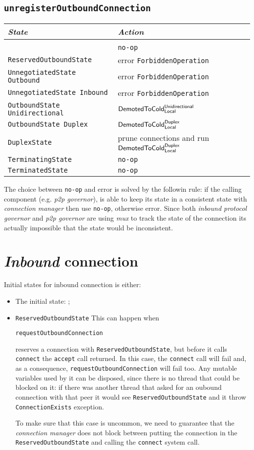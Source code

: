 \documentclass{article}
\def\InitialState{\textbullet}
\def\ReservedOutboundState{\texttt{ReservedOutboundState}}
\def\UnnegotiatedStateOut{\texttt{UnnegotiatedState Outbound}}
\def\UnnegotiatedStateIn{\texttt{UnnegotiatedState Inbound}}
\def\OutboundStateUni{\texttt{OutboundState Unidirectional}}
\def\OutboundStateDup{\texttt{OutboundState Duplex}}
\def\DuplexState{\texttt{DuplexState}}
\def\TerminatingState{\texttt{TerminatingState}}
\def\TerminatedState{\texttt{TerminatedState}}
\def\DemotedToColdDupLoc{$\text{\textsf{DemotedToCold}}^\text{\textsf{Duplex}}_\text{\textsf{Local}}$}
\def\DemotedToColdUniLoc{$\text{\textsf{DemotedToCold}}^\text{\textsf{Unidirectional}}_\text{\textsf{Local}}$}
\def\ptopgov{\textit{p2p governor}}
\def\mux{\textit{mux}}
\def\inbgov{\textit{inbound protocol governor}}
\def\connmngr{\textit{connection manager}}
\begin{document}
\subsection{\texttt{unregisterOutboundConnection}}
\begin{tabular}[h]{ll}
  \textit{State}           & \textit{Action} \\\hline\\[2pt]
  \InitialState{}          & \texttt{no-op} \\[8pt]
  \ReservedOutboundState{} & error \texttt{ForbiddenOperation} \\[8pt]
  \UnnegotiatedStateOut{}  & error \texttt{ForbiddenOperation} \\[8pt]
  \UnnegotiatedStateIn{}   & error \texttt{ForbiddenOperation} \\[8pt]
  \OutboundStateUni{}      & \DemotedToColdUniLoc{} \\[8pt]
  \OutboundStateDup{}      & \DemotedToColdDupLoc{} \\[8pt]
  \DuplexState{}           & prune connections and run \DemotedToColdDupLoc{} \\[8pt]
  \TerminatingState{}      & \texttt{no-op} \\[8pt]
  \TerminatedState{}       & \texttt{no-op} \\[8pt]
\end{tabular}
The choice between \texttt{no-op} and error is solved by the followin rule: if
the calling component (e.g. \ptopgov{}), is able to keep its state in
a consistent state with \connmngr{} then use \texttt{no-op}, otherwise
error.  Since both \inbgov{} and \ptopgov{} are using \mux{} to track the state
of the connection its actually impossible that the state would be inconsistent.

\section{\textit{Inbound} connection}
Initial states for inbound connection is either:
\begin{itemize}
  \item The initial state: \InitialState{};
  \item \ReservedOutboundState{}
    This can happen when
    \begin{center}
      \texttt{requestOutboundConnection}
    \end{center}
    reserves a connection with \ReservedOutboundState{}, but before it calls
    \texttt{connect} the \texttt{accept} call returned.  In this case, the
    \texttt{connect} call will fail and, as a consequence,
    \texttt{requestOutboundConnection} will fail too.  Any mutable variables
    used by it can be disposed, since there is no thread that could be blocked
    on it: if there was another thread that asked for an oubound connection
    with that peer it would see \ReservedOutboundState{} and it throw
    \texttt{ConnectionExists} exception.

    To make sure that this case is uncommon, we need to guarantee that the
    \connmngr{} does not block between putting the connection in the
    \ReservedOutboundState{} and calling the \texttt{connect} system call.
\end{itemize}
\end{document}
